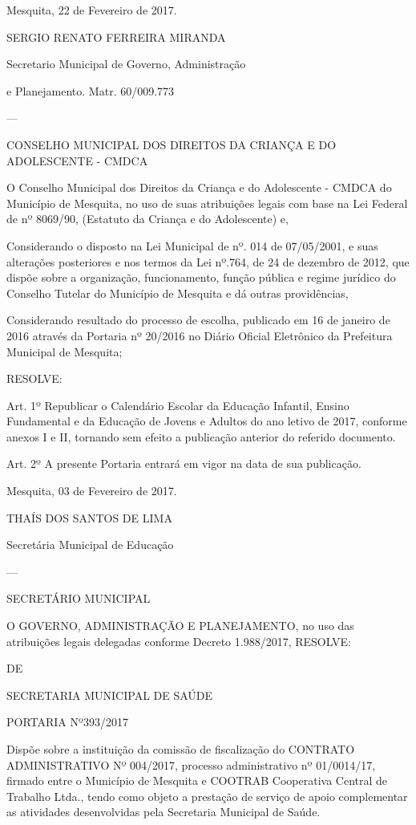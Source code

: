 \documentclass{doliberto}
\begin{document}
Mesquita, 22 de Fevereiro de 2017. 

SERGIO RENATO FERREIRA MIRANDA 

Secretario Municipal de Governo, Administração 

e  Planejamento. 
Matr. 60/009.773 

---

CONSELHO  MUNICIPAL  DOS  DIREITOS  DA  CRIANÇA  E 
DO ADOLESCENTE - CMDCA 

O  Conselho  Municipal  dos  Direitos  da  Criança  e  do 
Adolescente - CMDCA do Município de Mesquita, no uso de 
suas  atribuições  legais  com  base  na  Lei  Federal  de  nº 
8069/90, (Estatuto da Criança e do Adolescente) e, 

Considerando  o  disposto  na  Lei  Municipal  de  nº.  014  de 
07/05/2001, e suas alterações posteriores e nos termos da 
Lei nº.764, de 24 de dezembro de 2012, que dispõe sobre a 
organização,  funcionamento,  função  pública  e  regime 
jurídico do Conselho Tutelar do Município de Mesquita e dá 
outras providências, 

Considerando resultado do processo de escolha, publicado 
em  16  de  janeiro  de  2016  através  da  Portaria  nº  20/2016 
no  Diário  Oficial  Eletrônico  da  Prefeitura  Municipal  de 
Mesquita; 


RESOLVE:  
 
Art.  1º  Republicar  o  Calendário  Escolar  da  Educação 
Infantil,  Ensino  Fundamental  e  da  Educação  de  Jovens  e 
Adultos  do  ano  letivo  de  2017,  conforme  anexos  I  e  II, 
tornando  sem  efeito  a  publicação  anterior  do  referido 
documento.  
 
Art. 2º A presente Portaria entrará em vigor na data de sua 
publicação.  


Mesquita, 03 de Fevereiro de 2017. 

THAÍS DOS SANTOS DE LIMA 

Secretária Municipal de Educação 

---

SECRETÁRIO  MUNICIPAL 

O 
GOVERNO, 
ADMINISTRAÇÃO  E  PLANEJAMENTO,  no  uso  das 
atribuições legais delegadas conforme Decreto 1.988/2017, 
RESOLVE: 

DE 

SECRETARIA MUNICIPAL DE SAÚDE 
 
PORTARIA Nº393/2017 
 
Dispõe  sobre  a  instituição  da  comissão  de  fiscalização  do 
CONTRATO  ADMINISTRATIVO  Nº  004/2017,  processo 
administrativo  nº  01/0014/17, 
firmado  entre  o 
Município de Mesquita e COOTRAB Cooperativa Central 
de  Trabalho  Ltda.,  tendo  como  objeto  a  prestação  de 
serviço de apoio complementar as atividades desenvolvidas 
pela Secretaria Municipal de Saúde. 
 
\end{document}
